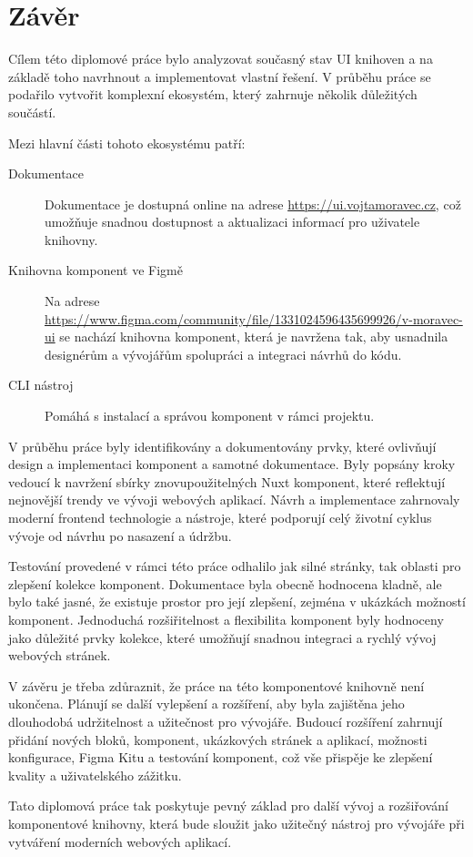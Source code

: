 
\chapter{Závěr}

Cílem této diplomové práce bylo analyzovat současný stav UI knihoven a na základě toho navrhnout a implementovat vlastní řešení. V průběhu práce se podařilo vytvořit komplexní ekosystém, který zahrnuje několik důležitých součástí.

Mezi hlavní části tohoto ekosystému patří:

\begin{description}
  \item[Dokumentace] Dokumentace je dostupná online na adrese \url{https://ui.vojtamoravec.cz}, což umožňuje snadnou dostupnost a aktualizaci informací pro uživatele knihovny.
  \item[Knihovna komponent ve Figmě] Na adrese \url{https://www.figma.com/community/file/1331024596435699926/v-moravec-ui} se nachází knihovna komponent, která je navržena tak, aby usnadnila designérům a vývojářům spolupráci a integraci návrhů do kódu.
  \item[CLI nástroj] Pomáhá s instalací a správou komponent v rámci projektu.
\end{description}

V průběhu práce byly identifikovány a dokumentovány prvky, které ovlivňují design a implementaci komponent a samotné dokumentace. Byly popsány kroky vedoucí k navržení sbírky znovupoužitelných Nuxt komponent, které reflektují nejnovější trendy ve vývoji webových aplikací. Návrh a implementace zahrnovaly moderní frontend technologie a nástroje, které podporují celý životní cyklus vývoje od návrhu po nasazení a údržbu.

Testování provedené v rámci této práce odhalilo jak silné stránky, tak oblasti pro zlepšení kolekce komponent. Dokumentace byla obecně hodnocena kladně, ale bylo také jasné, že existuje prostor pro její zlepšení, zejména v ukázkách možností komponent. Jednoduchá rozšiřitelnost a flexibilita komponent byly hodnoceny jako důležité prvky kolekce, které umožňují snadnou integraci a rychlý vývoj webových stránek.

V závěru je třeba zdůraznit, že práce na této komponentové knihovně není ukončena. Plánují se další vylepšení a rozšíření, aby byla zajištěna jeho dlouhodobá udržitelnost a užitečnost pro vývojáře. Budoucí rozšíření zahrnují přidání nových bloků, komponent, ukázkových stránek a aplikací, možnosti konfigurace, Figma Kitu a testování komponent, což vše přispěje ke zlepšení kvality a uživatelského zážitku.

Tato diplomová práce tak poskytuje pevný základ pro další vývoj a rozšiřování komponentové knihovny, která bude sloužit jako užitečný nástroj pro vývojáře při vytváření moderních webových aplikací.
